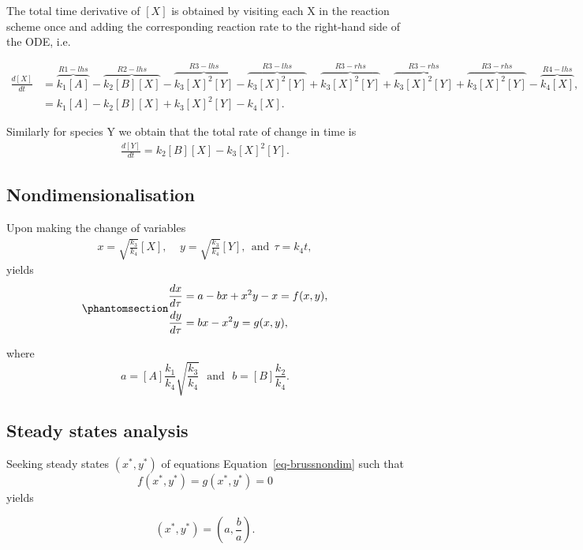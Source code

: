 \documentclass[
  letterpaper,
  DIV=11,
  numbers=noendperiod]{scrreprt}
\begin{document}
The total time derivative of \([X]\) is obtained by visiting each X in
the reaction scheme once and adding the corresponding reaction rate to
the right-hand side of the ODE, i.e.

\[  
 \begin{aligned}
 \frac{d[X]}{dt} &= \overbrace{k_1[A]}^{R1-lhs} - \overbrace{k_2[B][X]}^{R2-lhs} -  \overbrace{k_3[X]^2[Y]}^{R3-lhs} - \overbrace{k_3[X]^2[Y]}^{R3-lhs} + \overbrace{k_3[X]^2[Y]}^{R3-rhs}+ \overbrace{k_3[X]^2[Y]}^{R3-rhs}+ \overbrace{k_3[X]^2[Y]}^{R3-rhs} -\overbrace{k_4[X]}^{R4-lhs}, \nonumber \\
        &= k_1[A] - k_2[B][X] + k_3[X]^2[Y]   -k_4[X]. 
 \end{aligned}
 \]

Similarly for species Y we obtain that the total rate of change in time
is \[ 
 \begin{aligned}
  \frac{d[Y]}{dt}=k_2[B][X]-k_3[X]^2[Y].
 \end{aligned}
\]

\subsection{Nondimensionalisation}\label{nondimensionalisation-7}

Upon making the change of variables \[
\begin{aligned}
x=\sqrt{\frac{k_3}{k_4}}[X], \ \ \ \ \ y=\sqrt{\frac{k_3}{k_4}}[Y], \ \ \textrm{and} \ \ \tau=k_4 t, 
\end{aligned}
\] yields \begin{equation}\protect\phantomsection\label{eq-brussnondim}{
\begin{aligned}
\frac{d x}{d \tau} &= a-bx+x^2y-x = f(x,y), \\
\frac{d y}{d \tau} &= bx-x^2y = g(x,y), 
\end{aligned}
}\end{equation}

where \[
a=[A]\frac{k_1}{k_4}\sqrt{\frac{k_3}{k_4}} \ \ \ \textrm{and} \ \ \ b= [B]\frac{k_2}{k_4}.
\]

\subsection{Steady states analysis}\label{steady-states-analysis}

Seeking steady states \((x^*,y^*)\) of equations
Equation~\ref{eq-brussnondim} such that \[
f(x^*,y^*)=g(x^*,y^*)=0
\] yields

\[
(x^*,y^*)=(a,\frac{b}{a}).
\]
\end{document}
